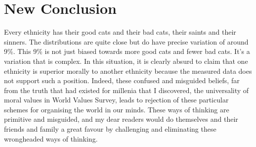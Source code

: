 \documentclass{amsart}
\begin{document}
\section{New Conclusion}

Every ethnicity has their good cats and their bad cats, their saints and their sinners.  The distributions are quite close but do have precise variation of around 9\%.  This 9\% is not just biased towards more good cats and fewer bad cats.  It's a variation that is complex.  In this situation, it is clearly absurd to claim that one ethnicity is superior morally to another ethnicity because the measured data does not support such a position.  Indeed, these confused and misguided beliefs, far from the truth that had existed for millenia that I discovered, the universality of moral values in World Values Survey, leads to rejection of these particular schemes for organising the world in our minds.  These ways of thinking are primitive and misguided, and my dear readers would do themselves and their friends and family a great favour by challenging and eliminating these wrongheaded ways of thinking.
\end{document}
